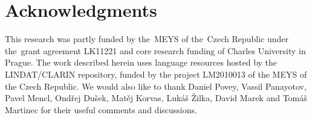\section*{Acknowledgments}
This research was partly funded by the~MEYS of the~Czech Republic under the~grant agreement LK11221 and core research funding of Charles University in Prague.
The work described herein uses language resources hosted by the LINDAT/CLARIN repository, funded by the project LM2010013 of the MEYS of the Czech Republic.
We would also like to thank Daniel Povey, Vassil Panayotov, Pavel Mencl, Ondřej Dušek, Matěj Korvas, Lukáš Žilka, David Marek and Tomáš Martinec for their useful comments and discussions.
